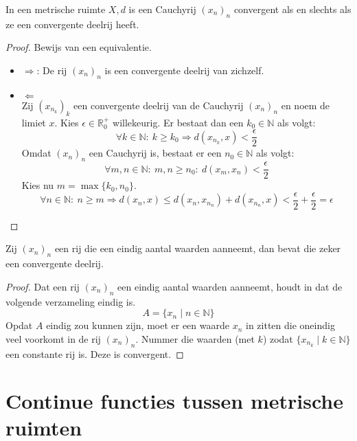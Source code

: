 \documentclass[main.tex]{subfiles}
\begin{document}
\begin{st}
  \label{st:cauchy-asa-convergente-deelrij}
  In een metrische ruimte $X,d$ is een Cauchyrij $(x_{n})_{n}$ convergent als en slechts als ze een convergente deelrij heeft. 

  \begin{proof}
    Bewijs van een equivalentie.
    \begin{itemize}
    \item $\Rightarrow$:
      De rij $(x_{n})_{n}$ is een convergente deelrij van zichzelf.
    \item $\Leftarrow$\\
      Zij $(x_{n_{k}})_{k}$ een convergente deelrij van de Cauchyrij $(x_{n})_{n}$ en noem de limiet $x$.
      Kies $\epsilon \in \mathbb{R}_{0}^{+}$ willekeurig.
      Er bestaat dan een $k_{0} \in \mathbb{N}$ als volgt:
      \[ \forall k\in \mathbb{N}:\ k \ge k_{0} \Rightarrow d(x_{n_{k}},x) < \frac{\epsilon}{2} \]
      Omdat $(x_{n})_{n}$ een Cauchyrij is, bestaat er een $n_{0} \in \mathbb{N}$ als volgt:
      \[ \forall m,n\in \mathbb{N}:\ m,n \ge n_{0}:\ d(x_{m},x_{n}) < \frac{\epsilon}{2} \]
      Kies nu $m = \max\{k_{0},n_{0}\}$.
      \[ \forall n\in \mathbb{N}:\ n \ge m \Rightarrow d(x_{n},x) \le d(x_{n},x_{n_{n}}) + d(x_{n_{n}},x) < \frac{\epsilon}{2} + \frac{\epsilon}{2} = \epsilon \]
    \end{itemize}
  \end{proof}
\end{st}

\begin{st}
  \label{st:rij-met-eindig-aantal-waarden-convergente-deelrij}
  Zij $(x_{n})_{n}$ een rij die een eindig aantal waarden aanneemt, dan bevat die zeker een convergente deelrij.

  \begin{proof}
    Dat een rij $(x_{n})_{n}$ een eindig aantal waarden aanneemt, houdt in dat de volgende verzameling eindig is.
    \[ A = \{ x_{n} \mid n \in \mathbb{N} \} \]
    Opdat $A$ eindig zou kunnen zijn, moet er een waarde $x_{n}$ in zitten die oneindig veel voorkomt in de rij $(x_{n})_{n}$.
    Nummer die waarden (met $k$) zodat $\{ x_{n_{k}} \mid k \in \mathbb{N} \}$ een constante rij is.
    Deze is convergent.\needed
  \end{proof}
\end{st}

\section{Continue functies tussen metrische ruimten}
\label{sec:cont-funct-tuss}
\end{document}
